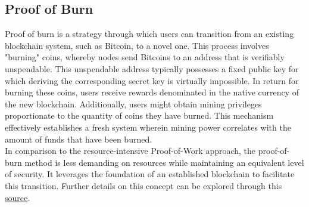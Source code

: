 \subsection{Proof of Burn}
Proof of burn is a strategy through which users can transition from an existing blockchain system, such as Bitcoin, to a novel one. This process involves "burning" coins, whereby nodes send Bitcoins to an address that is verifiably unspendable. This unspendable address typically possesses a fixed public key for which deriving the corresponding secret key is virtually impossible. In return for burning these coins, users receive rewards denominated in the native currency of the new blockchain. Additionally, users might obtain mining privileges proportionate to the quantity of coins they have burned. This mechanism effectively establishes a fresh system wherein mining power correlates with the amount of funds that have been burned.\\
In comparison to the resource-intensive Proof-of-Work approach, the proof-of-burn method is less demanding on resources while maintaining an equivalent level of security. It leverages the foundation of an established blockchain to facilitate this transition. Further details on this concept can be explored through this \href{https://en.bitcoin.it/wiki/Proof_of_burn}{source}.

